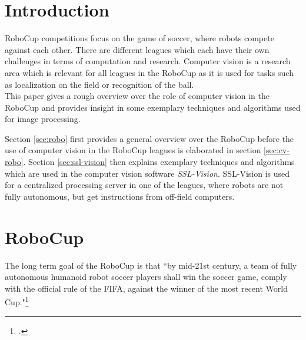 \newpage
\listoffigures
{}
\newpage

\renewcommand{\thepage}{\arabic{page}}

\setcounter{page}{1} 


\section{Introduction}
\label{sec:introduction}
RoboCup competitions focus on the game of soccer, where robots compete against
each other.
There are different leagues which each have their own challenges in terms of
computation and research. Computer vision is a research area which is relevant
for all leagues in the RoboCup as it is used for tasks such as localization on
the field or recognition of the ball.\\
This paper gives a rough overview over the role of computer vision in the
RoboCup and provides insight in some exemplary techniques and algorithms used
for image processing.

Section \ref{sec:robo} first provides a general overview over the RoboCup before
the use of computer vision in the RoboCup leagues is elaborated in section \ref{sec:cv-robo}.
Section \ref{sec:ssl-vision} then explains exemplary techniques and algorithms
which are used in the computer vision software \textit{SSL-Vision}.
SSL-Vision is used for a centralized processing server in one of the leagues,
where robots are not fully autonomous, but get instructions from off-field
computers.\\




\newpage
\section{RoboCup \label{sec:robo}}
The long term goal of the RoboCup is that ``by mid-21st century, a team of fully autonomous humanoid robot
soccer players shall win the soccer game, comply with the official rule of the
FIFA, against the winner of the most recent World
Cup."\footcite[Cf.][]{robo_objectives}

